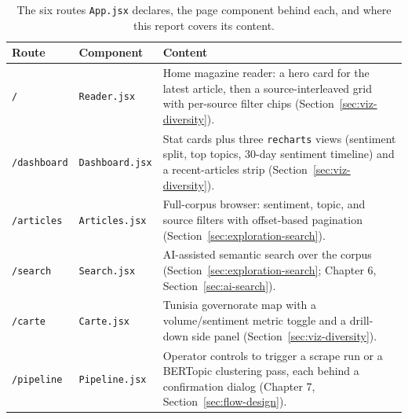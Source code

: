 \begin{table}[H]
\centering
\begin{tabular}{|p{2.0cm}|p{2.7cm}|p{8.3cm}|}
\hline
\textbf{Route} & \textbf{Component} & \textbf{Content} \\
\hline
\texttt{/} & \texttt{Reader.jsx} & Home magazine reader: a hero card for the latest article, then a source-interleaved grid with per-source filter chips (Section~\ref{sec:viz-diversity}). \\
\hline
\texttt{/dashboard} & \texttt{Dashboard.jsx} & Stat cards plus three \texttt{recharts} views (sentiment split, top topics, 30-day sentiment timeline) and a recent-articles strip (Section~\ref{sec:viz-diversity}). \\
\hline
\texttt{/articles} & \texttt{Articles.jsx} & Full-corpus browser: sentiment, topic, and source filters with offset-based pagination (Section~\ref{sec:exploration-search}). \\
\hline
\texttt{/search} & \texttt{Search.jsx} & AI-assisted semantic search over the corpus (Section~\ref{sec:exploration-search}; Chapter 6, Section~\ref{sec:ai-search}). \\
\hline
\texttt{/carte} & \texttt{Carte.jsx} & Tunisia governorate map with a volume/sentiment metric toggle and a drill-down side panel (Section~\ref{sec:viz-diversity}). \\
\hline
\texttt{/pipeline} & \texttt{Pipeline.jsx} & Operator controls to trigger a scrape run or a BERTopic clustering pass, each behind a confirmation dialog (Chapter 7, Section~\ref{sec:flow-design}). \\
\hline
\end{tabular}
\caption{The six routes \texttt{App.jsx} declares, the page component behind each, and where this report covers its content.}
\label{tab:routes}
\end{table}

